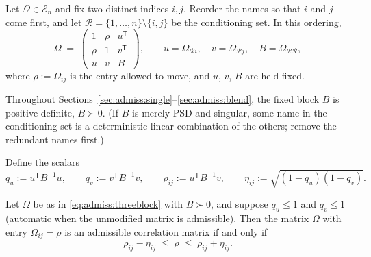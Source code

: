 Let $\Omega \in \mathcal{E}_n$ and fix two distinct indices $i, j$. Reorder
the names so that $i$ and $j$ come first, and let
$\mathcal{R} = \{1, \dots, n\} \setminus \{i, j\}$ be the conditioning set.
In this ordering,
\begin{equation}\label{eq:admiss:threeblock}
  \Omega \;=\;
  \begin{pmatrix}
    1 & \rho & u^{\mathsf T} \\
    \rho & 1 & v^{\mathsf T} \\
    u & v & B
  \end{pmatrix},
  \qquad
  u = \Omega_{\mathcal{R} i}, \quad
  v = \Omega_{\mathcal{R} j}, \quad
  B = \Omega_{\mathcal{R} \mathcal{R}},
\end{equation}
where $\rho := \Omega_{ij}$ is the entry allowed to move, and $u$, $v$,
$B$ are held fixed.

\begin{assumption}\label{ass:admiss:B}
Throughout Sections~\ref{sec:admiss:single}--\ref{sec:admiss:blend}, the
fixed block $B$ is positive definite, $B \succ 0$. (If $B$ is merely PSD
and singular, some name in the conditioning set is a deterministic linear
combination of the others; remove the redundant names first.)
\end{assumption}

Define the scalars
\begin{equation}\label{eq:admiss:scalars}
  q_u := u^{\mathsf T} B^{-1} u,
  \qquad
  q_v := v^{\mathsf T} B^{-1} v,
  \qquad
  \bar\rho_{ij} := u^{\mathsf T} B^{-1} v,
  \qquad
  \eta_{ij} := \sqrt{(1 - q_u)(1 - q_v)} .
\end{equation}

\begin{theorem}\label{thm:admiss:single}
Let $\Omega$ be as in \eqref{eq:admiss:threeblock} with $B \succ 0$, and
suppose $q_u \le 1$ and $q_v \le 1$ (automatic when the unmodified matrix is
admissible). Then the matrix $\Omega$ with entry $\Omega_{ij} = \rho$ is an
admissible correlation matrix if and only if
\begin{equation}\label{eq:admiss:interval}
  \bar\rho_{ij} - \eta_{ij}
  \;\le\; \rho \;\le\;
  \bar\rho_{ij} + \eta_{ij} .
\end{equation}
\end{theorem}

